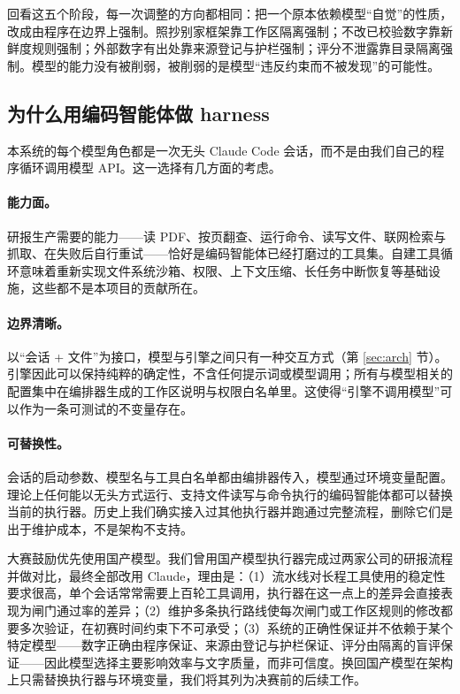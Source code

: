 \begin{insight}[：演进史的共同模式]
回看这五个阶段，每一次调整的方向都相同：把一个原本依赖模型“自觉”的性质，改成由程序在边界上强制。照抄别家框架靠工作区隔离强制；不改已校验数字靠新鲜度规则强制；外部数字有出处靠来源登记与护栏强制；评分不泄露靠目录隔离强制。模型的能力没有被削弱，被削弱的是模型“违反约束而不被发现”的可能性。
\end{insight}

\subsection{为什么用编码智能体做 harness}
\label{sec:disc-harness}

本系统的每个模型角色都是一次无头 Claude Code 会话，而不是由我们自己的程序循环调用模型 API。这一选择有几方面的考虑。

\paragraph{能力面。}研报生产需要的能力——读 PDF、按页翻查、运行命令、读写文件、联网检索与抓取、在失败后自行重试——恰好是编码智能体已经打磨过的工具集。自建工具循环意味着重新实现文件系统沙箱、权限、上下文压缩、长任务中断恢复等基础设施，这些都不是本项目的贡献所在。

\paragraph{边界清晰。}以“会话 + 文件”为接口，模型与引擎之间只有一种交互方式（第 \ref{sec:arch} 节）。引擎因此可以保持纯粹的确定性，不含任何提示词或模型调用；所有与模型相关的配置集中在编排器生成的工作区说明与权限白名单里。这使得“引擎不调用模型”可以作为一条可测试的不变量存在。

\paragraph{可替换性。}会话的启动参数、模型名与工具白名单都由编排器传入，模型通过环境变量配置。理论上任何能以无头方式运行、支持文件读写与命令执行的编码智能体都可以替换当前的执行器。历史上我们确实接入过其他执行器并跑通过完整流程，删除它们是出于维护成本，不是架构不支持。

\begin{tradeoff}
大赛鼓励优先使用国产模型。我们曾用国产模型执行器完成过两家公司的研报流程并做对比，最终全部改用 Claude，理由是：（1）流水线对长程工具使用的稳定性要求很高，单个会话常常需要上百轮工具调用，执行器在这一点上的差异会直接表现为闸门通过率的差异；（2）维护多条执行路线使每次闸门或工作区规则的修改都要多次验证，在初赛时间约束下不可承受；（3）系统的正确性保证并不依赖于某个特定模型——数字正确由程序保证、来源由登记与护栏保证、评分由隔离的盲评保证——因此模型选择主要影响效率与文字质量，而非可信度。换回国产模型在架构上只需替换执行器与环境变量，我们将其列为决赛前的后续工作。
\end{tradeoff}

